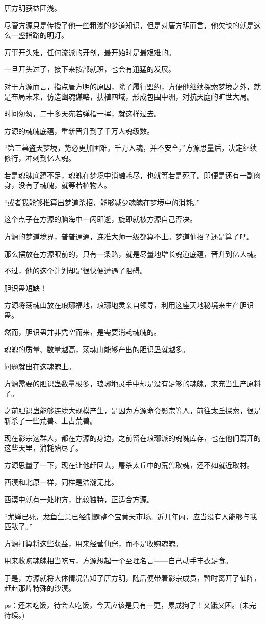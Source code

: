 \begin{this_body}
唐方明获益匪浅。

尽管方源只是传授了他一些粗浅的梦道知识，但是对唐方明而言，他欠缺的就是这么一盏指路的明灯。

万事开头难，任何流派的开创，最开始时是最艰难的。

一旦开头过了，接下来按部就班，也会有迅猛的发展。

对于方源而言，指点唐方明的原因，除了履行盟约，方便他继续探索梦境之外，就是布局未来，仿造幽魂谋略，扶植四域，形成包围中洲，对抗天庭的旷世大局。

时间匆匆，二十多天宛若弹指一挥，就这样过去。

方源的魂魄底蕴，重新晋升到了千万人魂级数。

“第三幕盗天梦境，势必更加困难。千万人魂，并不安全。”方源思量后，决定继续修行，冲刺到亿人魂。

若是魂魄底蕴不足，魂魄在梦境中消融耗尽，也就等若是死了。即便是还有一副肉身，没有了魂魄，就等若植物人。

“或者我能够推算出梦道杀招，能够减少魂魄在梦境中的消耗。”

这个点子在方源的脑海中一闪即逝，旋即就被方源自己否决。

方源的梦道境界，普普通通，连准大师一级都算不上。梦道仙招？还是算了吧。

那么摆放在方源眼前的，只有一条路，就是尽量地增长魂道底蕴，晋升到亿人魂。

不过，他的这个计划却是很快便遭遇了阻碍。

胆识蛊短缺！

方源将荡魂山放在琅琊福地，琅琊地灵亲自领导，利用这座天地秘境来生产胆识蛊。

然而，胆识蛊并非凭空而来，是需要消耗魂魄的。

魂魄的质量、数量越高，荡魂山能够产出的胆识蛊就越多。

问题就出在这魂魄上。

方源需要的胆识蛊数量极多，琅琊地灵手中却是没有足够的魂魄，来充当生产原料了。

之前胆识蛊能够连续大规模产生，是因为方源命令影宗等人，前往太丘探索，很是斩杀了一些荒兽、上古荒兽。

现在影宗这群人，都在方源的身边，之前留在琅琊派的魂魄库存，也在他们离开的这些天里，消耗殆尽了。

方源思量了一下，现在让他赶回去，屠杀太丘中的荒兽取魂，还不如就近取材。

西漠和北原一样，同样是浩瀚无比。

西漠中就有一处地方，比较独特，正适合方源。

“尤婵已死，龙鱼生意已经制霸整个宝黄天市场。近几年内，应当没有人能够与我匹敌了。”

方源打算将这些获益，用来经营仙窍，而不是收购魂魄。

用来收购魂魄相当吃亏，方源想起一个至理名言——自己动手丰衣足食。

于是，方源就将大体情况告知了唐方明，随后便带着影宗成员，暂时离开了仙阵，赶赴那片特殊的沙漠。

ps：还未吃饭，待会去吃饭，今天应该是只有一更，累成狗了！又饿又困。(未完待续。)

\end{this_body}

